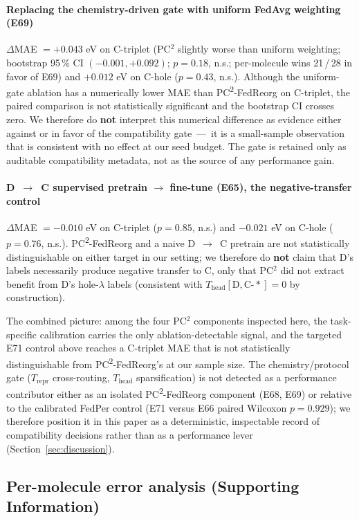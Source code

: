 \documentclass[11pt,a4paper]{article}
\newcommand{\PC}{PC\textsuperscript{2}-FedReorg}
\begin{document}
\paragraph{Replacing the chemistry-driven gate with uniform FedAvg weighting (E69)} $\Delta$MAE $= +0.043$ eV on C-triplet (PC$^2$ slightly worse than uniform weighting; bootstrap 95\,\% CI $(-0.001, +0.092)$; $p = 0.18$, n.s.; per-molecule wins 21\,/\,28 in favor of E69) and $+0.012$ eV on C-hole ($p = 0.43$, n.s.). Although the uniform-gate ablation has a numerically lower MAE than \PC{} on C-triplet, the paired comparison is not statistically significant and the bootstrap CI crosses zero. We therefore do \textbf{not} interpret this numerical difference as evidence either against or in favor of the compatibility gate~---~it is a small-sample observation that is consistent with no effect at our seed budget. The gate is retained only as auditable compatibility metadata, not as the source of any performance gain.

\paragraph{D~$\to$~C supervised pretrain $\to$ fine-tune (E65), the negative-transfer control} $\Delta$MAE $= -0.010$ eV on C-triplet ($p = 0.85$, n.s.) and $-0.021$ eV on C-hole ($p = 0.76$, n.s.). \PC{} and a naive D~$\to$~C pretrain are not statistically distinguishable on either target in our setting; we therefore do \textbf{not} claim that D's labels necessarily produce negative transfer to C, only that PC$^2$ did not extract benefit from D's hole-$\lambda$ labels (consistent with $T_{\mathrm{head}}[\mathrm{D}, \mathrm{C\text{-}*}] = 0$ by construction).

The combined picture: among the four PC$^2$ components inspected here, the task-specific calibration carries the only ablation-detectable signal, and the targeted E71 control above reaches a C-triplet MAE that is not statistically distinguishable from \PC{}'s at our sample size. The chemistry/protocol gate ($T_{\mathrm{repr}}$ cross-routing, $T_{\mathrm{head}}$ sparsification) is not detected as a performance contributor either as an isolated \PC{} component (E68, E69) or relative to the calibrated FedPer control (E71 versus E66 paired Wilcoxon $p = 0.929$); we therefore position it in this paper as a deterministic, inspectable record of compatibility decisions rather than as a performance lever (Section~\ref{sec:discussion}).

\subsection{Per-molecule error analysis (Supporting Information)}\label{sec:per-mol}
\end{document}
